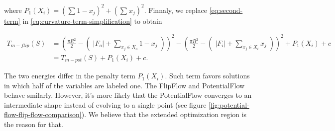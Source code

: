 where $P_1(X_i) = (\sum_{}{ 1-x_j})^2 + (\sum_{}{x_j})^2$. Finnaly, we  replace \eqref{eq:second-term} in \eqref{eq:curvature-term-simplification} to obtain

\begin{align}
T_{m-flip}(S) &= ( \frac{\pi R^2}{2} - (\; |F_o| + \sum_{ x_j \in X_o}{1-x_j} \; ) )^2 -(\frac{\pi R^2}{2} - (\; |F_i| + \sum_{x_j \in X_i}{x_j}\;))^2  + P_1(X_i) + c \nonumber \\
&= T_{m-pot}(S) + P_1(X_i) + c.
\end{align}

The two energies differ in the penalty term $P_1(X_i)$. Such term favors solutions in which half of the variables are labeled one. The FlipFlow and PotentialFlow behave smilarly. However, it's more likely that the PotentialFlow converges to an intermediate shape instead of evolving to a single point (see figure \ref{fig:potential-flow-flip-flow-comparison}). We believe that the extended optimization region is the reason for that.

